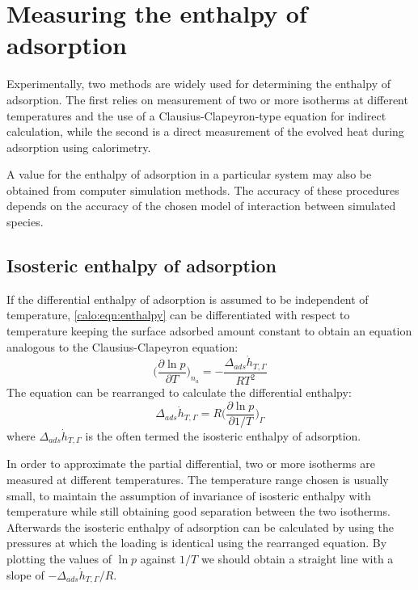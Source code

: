 
\section{Measuring the enthalpy of adsorption}

Experimentally, two methods are widely used for determining the
enthalpy of adsorption. The first relies on measurement of two
or more isotherms at different temperatures and the use of
a Clausius-Clapeyron-type equation for indirect calculation,
while the second is a direct measurement of the evolved heat
during adsorption using calorimetry.

A value for the enthalpy of adsorption in a particular system
may also be obtained from computer simulation methods.
The accuracy of these procedures depends on the accuracy of
the chosen model of interaction between simulated species.

\subsection{Isosteric enthalpy of adsorption}

If the differential enthalpy of adsorption is assumed to be independent
of temperature, \autoref{calo:eqn:enthalpy} can be differentiated
with respect to temperature keeping the surface adsorbed amount constant
to obtain an equation analogous to the Clausius-Clapeyron equation:
%
\begin{equation}
	\Big( \frac{\partial \ln p}{\partial T} \Big)_{n_a} = -\frac{\Delta_{ads}\dot{h}_{T, \Gamma}}{R T^2}
\end{equation}
%
The equation can be rearranged to calculate the differential enthalpy:
%
\begin{equation}\label{calo:eqn:claus-clap}
	\Delta_{ads}\dot{h}_{T, \Gamma} = R \Big( \frac{\partial \ln p}{\partial 1 / T} \Big)_{\Gamma}
\end{equation}
%
where \(\Delta_{ads}\dot{h}_{T, \Gamma}\) is the often termed the
isosteric enthalpy of adsorption.

In order to approximate the partial differential, two or more
isotherms are measured at different temperatures. The temperature
range chosen is usually small, to maintain the assumption of invariance
of isosteric enthalpy with temperature while still obtaining good 
separation between the two isotherms.
Afterwards the isosteric enthalpy of adsorption can be calculated
by using the pressures at which the loading is identical using the
rearranged equation. By plotting the values of \(\ln p\) against
\(1 / T\) we should obtain a straight line with a slope
of \(- \Delta_{ads}\dot{h}_{T, \Gamma} / R\).

